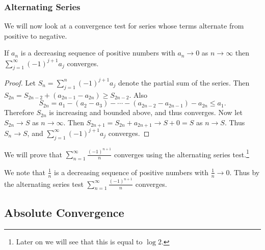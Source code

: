 \documentclass[a4paper]{scrartcl}
\begin{document}

\subsubsection{Alternating Series}

We will now look at a convergence test for series whose terms alternate from positive to negative.

\begin{theorem}
	If $a_n$ is a decreasing sequence of positive numbers with $a_n \rightarrow 0$ as $n \rightarrow \infty$ then $\sum_{j = 1}^{\infty} (-1)^{j + 1}a_j$ converges.
\end{theorem}
\begin{proof}
	Let $S_n = \sum_{j = 1}^n (-1)^{j + 1}a_j$ denote the partial sum of the series. Then
	$
		S_{2n} = S_{2n - 2} + (a_{2n - 1} - a_{2n}) \geq S_{2n - 2}.
	$
	Also
	$$
		S_{2n} = a_1 - (a_2 - a_3) - \cdots - (a_{2n - 2} - a_{2n - 1}) - a_{2n}
		\leq a_1.
	$$
	Therefore $S_{2n}$ is increasing and bounded above, and thus converges. Now let $S_{2n} \rightarrow S$ as $n \rightarrow \infty$. Then $S_{2n + 1} = S_{2n} + a_{2n + 1} \rightarrow S + 0 = S$ as $n \rightarrow S$. Thus $S_n \rightarrow S$, and $\sum_{j = 1}^{\infty} (-1)^{j + 1}a_j$ converges.
\end{proof}

\begin{example}
	We will prove that $\sum_{n = 1}^{\infty} \frac{(-1)^{n + 1}}{n}$ converges using the alternating series test.\footnote{Later on we will see that this is equal to $\log 2$.}

	We note that $\frac{1}{n}$ is a decreasing sequence of positive numbers with $\frac{1}{n} \rightarrow 0$. Thus by the alternating series test $\sum_{n = 1}^{\infty} \frac{(-1)^{n + 1}}{n}$ converges. 
\end{example}

\subsection{Absolute Convergence}
\end{document}
